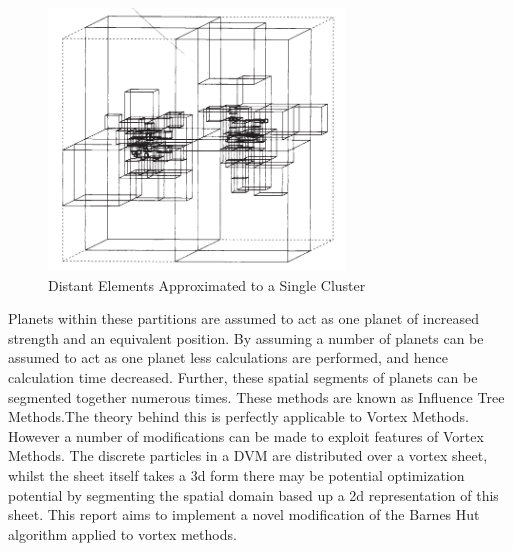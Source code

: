 \begin{figure}[H]
\begin{center}
\includegraphics[width=0.7\textwidth]{Referenced_Figures/BarnesHutSpace.png}
\caption{\label{fig:BarnesHutSpace}Distant Elements Approximated to a Single Cluster}
\end{center}
\end{figure}

Planets within these partitions are assumed to act as one planet of increased strength and an equivalent position. By assuming a number of planets can be assumed to act as one planet less calculations are performed, and hence calculation time decreased. Further, these spatial segments of planets can be segmented together numerous times. These methods are known as Influence Tree Methods.The theory behind this is perfectly applicable to Vortex Methods. However a number of modifications can be made to exploit features of Vortex Methods. The discrete particles in a DVM are distributed over a vortex sheet, whilst the sheet itself takes a 3d form there may be potential optimization potential by segmenting the spatial domain based up a 2d representation of this sheet. This report aims to implement a novel modification of the Barnes Hut algorithm applied to vortex methods.

